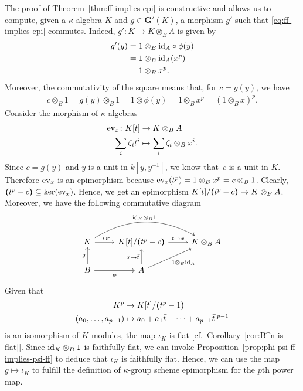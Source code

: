 The proof of Theorem~\ref{thm:ff-implies-epi} is constructive and allows us to compute, given a $\kappa$-algebra $K$ and $g\in\mathbf G'(K)$, a morphism $g'$ such that \eqref{eq:ff-implies-epi} commutes. Indeed, $g'\colon K\to K\otimes_BA$ is given by
\begin{align*}
    g'(y) &= 1\otimes_B\text{\rm id}_A\circ\phi(y)\\
        &= 1\otimes_B\text{\rm id}_A(x^p)\\
        &= 1\otimes_Bx^p.
\end{align*}
Moreover, the commutativity of the square means that, for $c=g(y)$, we have
\begin{align*}
    c\otimes_B1 = g(y)\otimes_B1 = 1\otimes\phi(y) = 1\otimes_Bx^p = (1\otimes_Bx)^p.
\end{align*}
Consider the morphism of $\kappa$-algebras
\begin{align*}
    \text{\rm ev}_x\colon K[t]&\to K\otimes_BA\\
    \sum_i\zeta_it^i&\mapsto\sum_i\zeta_i\otimes_Bx^i.
\end{align*}
Since $c=g(y)$ and $y$ is a unit in $k[y,y^{-1}]$, we know that~$c$ is a unit in $K$. Therefore $\text{\rm ev}_x$ is an epimorphism because $\text{\rm ev}_x(t^p)=1\otimes_Bx^p=c\otimes_B1$. Clearly, $\textrm{\boldmath$($}t^p-c\textrm{\boldmath$)$}\subseteq\ker(\text{\rm ev}_x)$. Hence, we get an epimorphism $K[t]/\textrm{\boldmath$($}t^p-c\textrm{\boldmath$)$}\to K\otimes_BA$. Moreover, we have the following commutative diagram
$$
    \begin{tikzcd}
        K
                \arrow[r,"\iota_K",pos=0.6]
                \arrow[rr,bend left,"\id_K\otimes_B1"]
            &{K[t]/\gen{t^p-c}}
                \arrow[r,"\bar t\mapsto x"]
            &K\otimes_BA\\
        B
                \arrow[u,"g"]
                \arrow[r,"\phi"']
            &A
                \arrow[ru,"1\otimes_B\id_A"']
                \arrow[u,"x\mapsto\bar t"]
    \end{tikzcd}
$$
Given that
\begin{align*}
     K^p&\to K[t]/\textrm{\boldmath$($}t^p-1\textrm{\boldmath$)$}\\
     (a_0,\dots,a_{p-1})
        &\mapsto a_0+a_1\bar t+\cdots+a_{p-1}\bar t^{\;p-1}
\end{align*}
is an isomorphism of $K$-modules, the map $\iota_K$ is flat [cf.~Corollary~\ref{cor:B^n-is-flat}]. Since $\text{\rm id}_K\otimes_B1$ is faithfully flat, we can invoke Proposition~\ref{prop:phi-psi-ff-implies-psi-ff} to deduce that $\iota_K$ is faithfully flat. Hence, we can use the map $g\mapsto\iota_K$ to fulfill the definition of $\kappa$-group scheme epimorphism for the $p$th power map.


